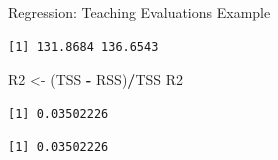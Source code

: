 \documentclass[
  ignorenonframetext,
]{beamer}
\newenvironment{Shaded}{\begin{snugshade}}{\end{snugshade}}
\newcommand{\CommentTok}[1]{\textcolor[rgb]{0.56,0.35,0.01}{\textit{#1}}}
\newcommand{\DecValTok}[1]{\textcolor[rgb]{0.00,0.00,0.81}{#1}}
\newcommand{\FunctionTok}[1]{\textcolor[rgb]{0.13,0.29,0.53}{\textbf{#1}}}
\newcommand{\NormalTok}[1]{#1}
\newcommand{\OtherTok}[1]{\textcolor[rgb]{0.56,0.35,0.01}{#1}}
\newcommand{\SpecialCharTok}[1]{\textcolor[rgb]{0.81,0.36,0.00}{\textbf{#1}}}
\begin{document}
\begin{frame}[fragile]{Regression: Teaching Evaluations Example}
\protect\hypertarget{regression-teaching-evaluations-example-14}{}
\normalsize

\begin{Shaded}
\end{Shaded}

\begin{verbatim}
[1] 131.8684 136.6543
\end{verbatim}

\begin{Shaded}
\begin{Highlighting}[]
\NormalTok{R2 }\OtherTok{\textless{}{-}}\NormalTok{ (TSS }\SpecialCharTok{{-}}\NormalTok{ RSS)}\SpecialCharTok{/}\NormalTok{TSS}
\NormalTok{R2}
\end{Highlighting}
\end{Shaded}

\begin{verbatim}
[1] 0.03502226
\end{verbatim}

\begin{Shaded}
\end{Shaded}

\begin{verbatim}
[1] 0.03502226
\end{verbatim}

\normalsize
\end{frame}
\end{document}
